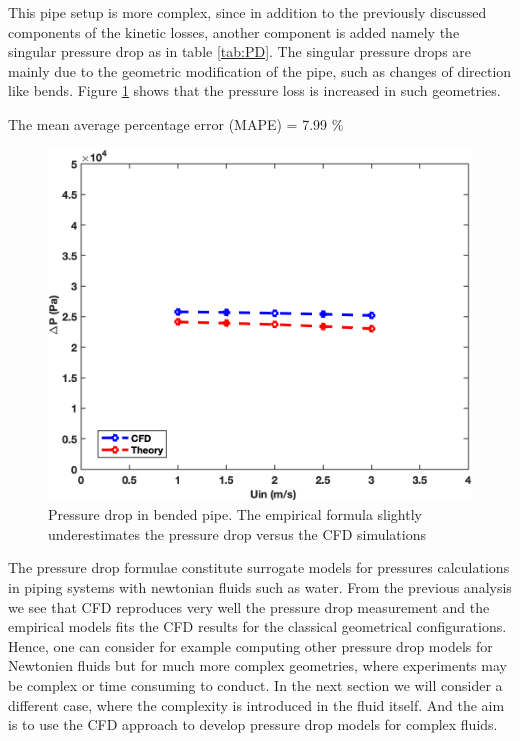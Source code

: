 \documentclass[review,3p,times,12pt]{elsarticle}
\begin{document}
This pipe setup is more complex, since in addition to the previously discussed components of the  kinetic losses, another component is added namely the singular pressure drop as in table \ref{tab:PD}. The singular pressure drops are mainly due to the geometric modification of the pipe, such as changes of direction like bends. Figure \ref{bend:theo} shows that the pressure loss is increased in such geometries.
\begin{minipage}[t]{0.45\textwidth}
\vspace{3.5cm}
\small{The mean average percentage error (MAPE) = 7.99 $\%$}
\end{minipage} \hfill 
\begin{minipage}[t]{0.55\textwidth}
\begin{figure}[H]
\begin{center}
\includegraphics[scale = 0.45]{figs/bend1}
\caption{ Pressure drop in bended pipe. The empirical formula slightly underestimates the pressure drop versus the CFD simulations }
\label{bend:theo}
\end{center}
\end{figure}
\end{minipage}

The pressure drop formulae constitute surrogate models for pressures calculations in piping systems with newtonian fluids such as water. From the previous analysis we see that CFD reproduces very well the pressure drop measurement and the empirical models fits the CFD results for the classical geometrical configurations. Hence, one can consider for example computing other pressure drop models for Newtonien fluids but for much more complex geometries, where experiments may be complex or time consuming to conduct. In the next section we will consider a different case, where the complexity is introduced in the fluid itself. And the aim is to use the CFD approach to develop pressure drop models for complex fluids.
\end{document}

